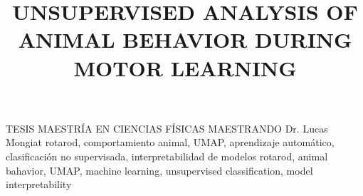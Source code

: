 \title{\textbf{UNSUPERVISED ANALYSIS OF ANIMAL BEHAVIOR DURING MOTOR LEARNING}}
\trabajo
{
	TESIS
}
\carrera
{
	MAESTRÍA EN CIENCIAS FÍSICAS
}
\grado
{
    MAESTRANDO
}
\jurado
{
	Dr. Lucas Mongiat
}
\palabrasclave
{
	rotarod,
	comportamiento animal,
	UMAP,
	aprendizaje automático,
	clasificación no supervisada,
	interpretabilidad de modelos
}
\keywords
{
	rotarod,
	animal bahavior,
	UMAP,
	machine learning,
	unsupervised classification,
	model interpretability
}
